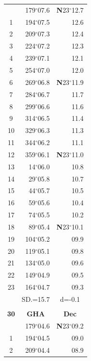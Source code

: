 \documentclass[10pt, a4paper]{report}
\begin{document}
\begin{scriptsize}
\begin{tabular*}{0.2\textwidth}[t]{@{\extracolsep{\fill}}|c|rr|}
\hline\rule{0pt}{2.6ex}\noindent
0 & 179$^\circ$07.6 & \textbf{N}23$^\circ$12.7\\
1 & 194$^\circ$07.5 & 12.6\\
2 & 209$^\circ$07.3 & 12.4\\
3 & 224$^\circ$07.2 & \raisebox{0.24ex}{\boldmath$\cdot$~\boldmath$\cdot$~~}12.3\\
4 & 239$^\circ$07.1 & 12.1\\
5 & 254$^\circ$07.0 & 12.0\\[2Pt]
6 & 269$^\circ$06.8 & \textbf{N}23$^\circ$11.9\\
7 & 284$^\circ$06.7 & 11.7\\
8 & 299$^\circ$06.6 & 11.6\\
9 & 314$^\circ$06.5 & \raisebox{0.24ex}{\boldmath$\cdot$~\boldmath$\cdot$~~}11.4\\
10 & 329$^\circ$06.3 & 11.3\\
11 & 344$^\circ$06.2 & 11.1\\[2Pt]
12 & 359$^\circ$06.1 & \textbf{N}23$^\circ$11.0\\
13 & 14$^\circ$06.0 & 10.8\\
14 & 29$^\circ$05.8 & 10.7\\
15 & 44$^\circ$05.7 & \raisebox{0.24ex}{\boldmath$\cdot$~\boldmath$\cdot$~~}10.5\\
16 & 59$^\circ$05.6 & 10.4\\
17 & 74$^\circ$05.5 & 10.2\\[2Pt]
18 & 89$^\circ$05.4 & \textbf{N}23$^\circ$10.1\\
19 & 104$^\circ$05.2 & 09.9\\
20 & 119$^\circ$05.1 & 09.8\\
21 & 134$^\circ$05.0 & \raisebox{0.24ex}{\boldmath$\cdot$~\boldmath$\cdot$~~}09.6\\
22 & 149$^\circ$04.9 & 09.5\\
23 & 164$^\circ$04.7 & 09.3\\
\hline
\rule{0pt}{2.4ex} & \multicolumn{1}{c}{SD.=15.7} & \multicolumn{1}{c|}{d=-0.1}\\
\hline
\multicolumn{1}{c}{}\\[-0.5ex]\hline
\multicolumn{1}{|c|}{\rule{0pt}{2.6ex}\textbf{30}} & \multicolumn{1}{c}{\textbf{GHA}} & \multicolumn{1}{c|}{\textbf{Dec}}\\
\hline\rule{0pt}{2.6ex}\noindent
0 & 179$^\circ$04.6 & \textbf{N}23$^\circ$09.2\\
1 & 194$^\circ$04.5 & 09.0\\
2 & 209$^\circ$04.4 & 08.9\\

\end{tabular*}
\end{scriptsize}
\end{document}
